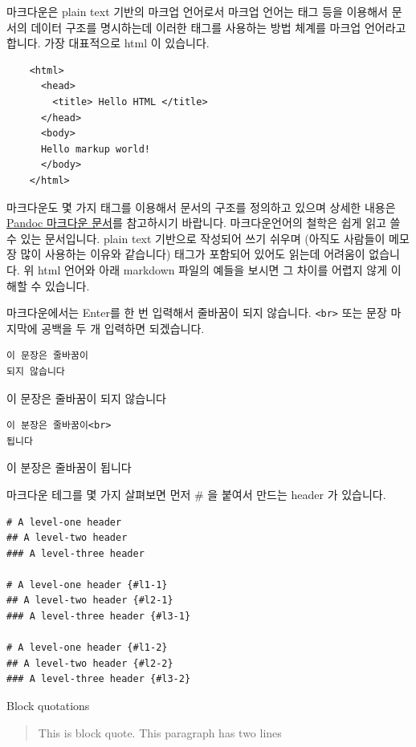 \documentclass[
  a4paper,
]{book}
\begin{document}
마크다운은 plain text 기반의 마크업 언어로서 마크업 언어는 태그 등을
이용해서 문서의 데이터 구조를 명시하는데 이러한 태그를 사용하는 방법
체계를 마크업 언어라고 합니다. 가장 대표적으로 html 이 있습니다.

\begin{verbatim}
    <html>
      <head>
        <title> Hello HTML </title>
      </head>
      <body>
      Hello markup world!
      </body>
    </html>
\end{verbatim}

마크다운도 몇 가지 태그를 이용해서 문서의 구조를 정의하고 있으며 상세한
내용은
\href{https://rmarkdown.rstudio.com/authoring_pandoc_markdown.html}{Pandoc
마크다운 문서}를 참고하시기 바랍니다. 마크다운언어의 철학은 쉽게 읽고 쓸
수 있는 문서입니다. plain text 기반으로 작성되어 쓰기 쉬우며 (아직도
사람들이 메모장 많이 사용하는 이유와 같습니다) 태그가 포함되어 있어도
읽는데 어려움이 없습니다. 위 html 언어와 아래 markdown 파일의 예들을
보시면 그 차이를 어렵지 않게 이해할 수 있습니다.

마크다운에서는 Enter를 한 번 입력해서 줄바꿈이 되지 않습니다.
\texttt{\textless{}br\textgreater{}} 또는 문장 마지막에 공백을 두 개
입력하면 되겠습니다.

\begin{verbatim}
이 문장은 줄바꿈이 
되지 않습니다
\end{verbatim}

이 문장은 줄바꿈이 되지 않습니다

\begin{verbatim}
이 분장은 줄바꿈이<br>
됩니다
\end{verbatim}

이 분장은 줄바꿈이 됩니다

마크다운 테그를 몇 가지 살펴보면 먼저 \# 을 붙여서 만드는 header 가
있습니다.

\begin{verbatim}
# A level-one header
## A level-two header
### A level-three header

# A level-one header {#l1-1}
## A level-two header {#l2-1}
### A level-three header {#l3-1}

# A level-one header {#l1-2}
## A level-two header {#l2-2}
### A level-three header {#l3-2}
\end{verbatim}

Block quotations

\begin{quote}
This is block quote. This paragraph has two lines
\end{quote}
\end{document}
